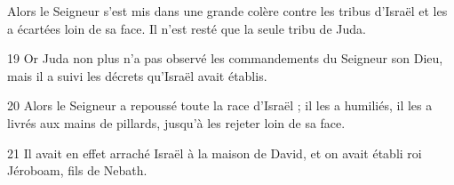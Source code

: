 Alors le Seigneur s’est mis dans une grande colère contre les tribus d’Israël et les a écartées loin de sa face. Il n’est resté que la seule tribu de Juda.

19 Or Juda non plus n’a pas observé les commandements du Seigneur son Dieu, mais il a suivi les décrets qu’Israël avait établis.

20 Alors le Seigneur a repoussé toute la race d’Israël ; il les a humiliés, il les a livrés aux mains de pillards, jusqu’à les rejeter loin de sa face.

21 Il avait en effet arraché Israël à la maison de David, et on avait établi roi Jéroboam, fils de Nebath.